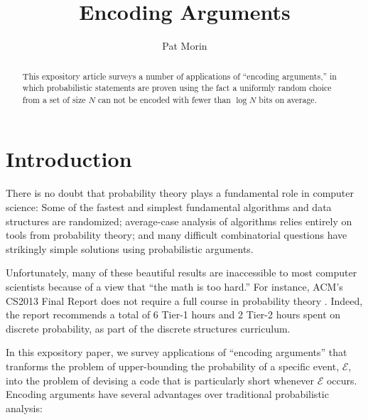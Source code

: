 \documentclass[lotsofwhite]{patmorin}
\title{Encoding Arguments}
\author{Pat Morin}
\date{}
\begin{document}
\begin{titlepage}
\maketitle

\begin{abstract}
\setlength{\baselineskip}{15.84pt}
This expository article surveys a number of applications of ``encoding
arguments,'' in which probabilistic statements are proven using the fact
a uniformly random choice from a set of size $N$ can not be encoded with
fewer than $\log N$ bits on average.
\end{abstract}


\end{titlepage}
\tableofcontents
\newpage
{}

\section{Introduction}

There is no doubt that probability theory plays a fundamental role
in computer science: Some of the fastest and simplest fundamental
algorithms and data structures are randomized; average-case analysis of
algorithms relies entirely on tools from probability theory; and many
difficult combinatorial questions have strikingly simple solutions using
probabilistic arguments.

Unfortunately, many of these beautiful results are inaccessible to most
computer scientists because of a view that ``the math is too hard.''
For instance, ACM's CS2013 Final Report does not require a full course
in probability theory \cite[Page~50]{acm2013}. Indeed, the report
recommends a total of 6 Tier-1 hours and 2 Tier-2 hours spent on discrete
probability, as part of the discrete structures curriculum.

In this expository paper, we survey applications of ``encoding arguments''
that tranforms the problem of upper-bounding the probability of a
specific event, $\mathcal{E}$, into the problem of devising a code that
is particularly short whenever $\mathcal{E}$ occurs.  Encoding arguments
have several advantages over traditional probabilistic analysis:
\end{document}
